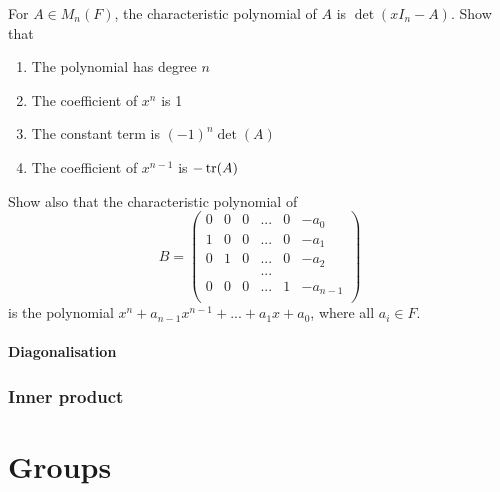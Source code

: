 \documentclass[11pt]{article}
\begin{document}
\begin{problem}
  For \(A\in M_n(F)\), the characteristic polynomial of \(A\) is \(\det(xI_n-A)\). Show that
  \begin{enumerate}
    \item The polynomial has degree \(n\)
    \item The coefficient of \(x^n\) is 1
    \item The constant term is \((-1)^n\det(A)\)
    \item The coefficient of \(x^{n-1}\) is \(-\tr(A)\)
  \end{enumerate}
  Show also that the characteristic polynomial of
  \[B=\begin{pmatrix}
    0&0&0&...&0&-a_0\\
    1&0&0&...&0&-a_1\\
    0&1&0&...&0&-a_2\\
    &&&...&&\\
    0&0&0&...&1&-a_{n-1}\\
  \end{pmatrix}\]
  is the polynomial \(x^n+a_{n-1}x^{n-1}+...+a_1x+a_0\), where all \(a_i\in F\).
\end{problem}
\subsection{Diagonalisation}

\section{Inner product}

\pagebreak
\part{Groups}
\end{document}
